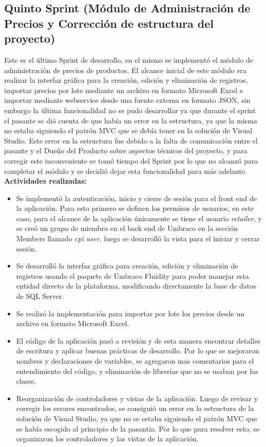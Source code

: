 \subsection{Quinto Sprint (Módulo de Administración de Precios y Corrección de estructura del proyecto)} 
Este es el último Sprint de desarrollo, en el mismo se implementó el módulo de administración de precios de productos. El alcance inicial de este módulo era realizar la interfaz gráfica para la creación, edición y eliminación de registros, importar precios por lote mediante un archivo en formato Microsoft Excel e importar mediante webservice desde una fuente externa en formato JSON, sin embargo la última funcionalidad no se pudo desarrollar ya que durante el sprint el pasante se dió cuenta de que había un error en la estructura, ya que la misma no estaba siguiendo el patrón MVC que se debía tener en la solución de Visual Studio. Este error en la estructura fue debido a la falta de comunicación entre el pasante y el Dueño del Producto sobre aspectos técnicos del proyecto, y para corregir este inconveniente se tomó tiempo del Sprint por lo que no alcanzó para completar el módulo y se decidió dejar esta funcionalidad para más adelante.
\vskip 0.5cm
\textbf{Actividades realizadas:}
\begin{itemize} 
   \item Se implementó la autenticación, inicio y cierre de sesión para el front end de la aplicación. Para esto primero se definen los permisos de usuarios, en este caso, para el alcance de la aplicación únicamente se tiene el usuario \emph{retailer}, y se creó un grupo de miembro en el back end de Umbraco en la sección Members llamado \emph{cpi user}, luego se desarrolló la vista para el iniciar y cerrar sesión.
   \item Se desarrolló la interfaz gráfica para creación, edición y eliminación de registros usando el paquete de Umbraco Fluidity para poder manejar esta entidad directo de la plataforma, modificando directamente la base de datos de SQL Server.
   \item Se realizó la implementación para importar por lote los precios desde un archivo en formato Microsoft Excel.
   \item El código de la aplicación pasó a revisión y de esta manera encontrar detalles de escritura y aplicar buenas prácticas de desarrollo. Por lo que se mejoraron nombres y declaraciones de variables, se agregaron mas comentarios para el entendimiento del código, y eliminación de librerías que no se usaban por las clases.
   \item Reorganización de controladores y vistas de la aplicación. Luego de revisar y corregir los errores encontrados, se consiguió un error en la estructura de la solución de Visual Studio, ya que no se estaba siguiendo el patrón MVC que se había escogido al principio de la pasantía. Por lo que para resolver esto, se organizaron los controladores y las vistas de la aplicación.
\end{itemize}

